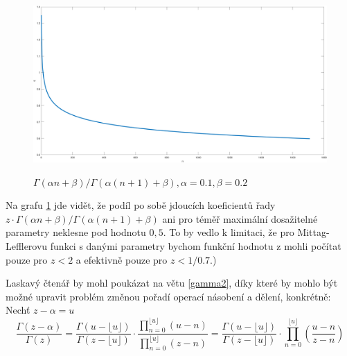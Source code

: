 \documentclass[a4paper,12pt,twoside]{article}
\theoremstyle{definition}
\theoremstyle{remark}
\numberwithin{equation}{section}
\numberwithin{table}{section}
\numberwithin{figure}{section}
\begin{document}
\begin{figure} %
	\caption{${\Gamma \left(\alpha n + \beta\right)}/{\Gamma \left(\alpha \left(n+1\right) + \beta\right)}, \alpha = 0.1, \beta = 0.2$}
	\includegraphics[width=1\textwidth]{fracGammaPlot.png}
	\label{fig:fracGammaPlot}
\end{figure}

Na grafu \ref{fig:fracGammaPlot} jde vidět, že podíl po sobě jdoucích koeficientů řady $z \cdot {\Gamma \left(\alpha n + \beta\right)}/{\Gamma \left(\alpha \left(n+1\right) + \beta\right)}$ ani pro téměř maximální dosažitelné parametry neklesne pod hodnotu $0,5$. To by vedlo k limitaci, že pro Mittag-Lefflerovu funkci s danými parametry bychom funkční hodnotu z mohli počítat pouze pro $z < 2$ a efektivně pouze pro $z < 1/0.7$.)

Laskavý čtenář by mohl poukázat na větu \ref{gamma2}, díky které by mohlo být možné upravit problém změnou pořadí operací násobení a dělení, konkrétně:
Nechť $z-\alpha = u$
$$\frac{\Gamma\left(z - \alpha\right)}{\Gamma\left(z\right)} = 
\frac{\Gamma\left(u-\lfloor u\rfloor \right)}{\Gamma \left(z - \lfloor u\rfloor \right)} \cdot \frac{\prod_{n=0}^{\lfloor u \rfloor } \left(u-n\right)}{\prod_{n=0}^{\lfloor u\rfloor} \left(z-n\right)}  = 
\frac{\Gamma\left(u-\lfloor u\rfloor \right)}{\Gamma \left(z - \lfloor u\rfloor \right)} \cdot \prod_{n=0}^{\lfloor u \rfloor} \left(\frac{u-n}{z-n}\right)  $$
\end{document}
